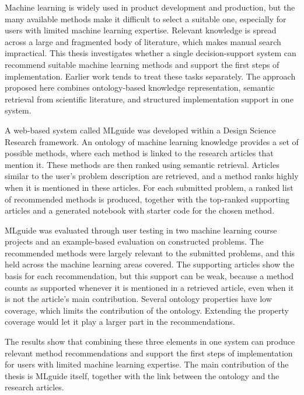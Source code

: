 Machine learning is widely used in product development and production,
but the many available methods make it difficult to select a suitable one,
especially for users with limited machine learning expertise.
Relevant knowledge is spread across a large and fragmented body of literature,
which makes manual search impractical.
This thesis investigates whether a single decision-support system can recommend
suitable machine learning methods and support the first steps of implementation.
Earlier work tends to treat these tasks separately.
The approach proposed here combines ontology-based knowledge representation,
semantic retrieval from scientific literature,
and structured implementation support in one system.

A web-based system called MLguide was developed
within a Design Science Research framework.
An ontology of machine learning knowledge provides a set of possible methods,
where each method is linked to the research articles that mention it.
These methods are then ranked using semantic retrieval.
Articles similar to the user's problem description are retrieved,
and a method ranks highly when it is mentioned in these articles.
For each submitted problem, a ranked list of recommended methods is produced,
together with the top-ranked supporting articles
and a generated notebook with starter code for the chosen method.

MLguide was evaluated through user testing in two machine learning course projects
and an example-based evaluation on constructed problems.
The recommended methods were largely relevant to the submitted problems,
and this held across the machine learning areas covered.
The supporting articles show the basis for each recommendation,
but this support can be weak,
because a method counts as supported whenever it is mentioned
in a retrieved article, even when it is not the article's main contribution.
Several ontology properties have low coverage,
which limits the contribution of the ontology.
Extending the property coverage would let it play 
a larger part in the recommendations.

The results show that combining these three elements in
one system
can produce relevant method recommendations
and support the first steps of implementation
for users with limited machine learning expertise.
The main contribution of the thesis is MLguide itself,
together with the link between the ontology and the research articles.